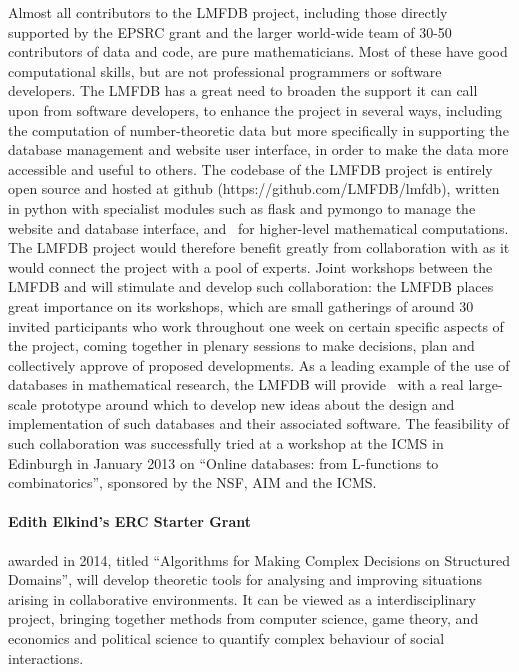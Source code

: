 Almost all contributors to the LMFDB project, including those directly
supported by the EPSRC grant and the larger world-wide team of 30-50
contributors of data and code, are pure mathematicians.  Most of these
have good computational skills, but are not professional programmers
or software developers.  The LMFDB has a great need to broaden the
support it can call upon from software developers, to enhance the
project in several ways, including the computation of number-theoretic
data but more specifically in supporting the database management and
website user interface, in order to make the data more accessible and
useful to others.  The codebase of the LMFDB project is entirely open
source and hosted at github (https://github.com/LMFDB/lmfdb), written
in python with specialist modules such as flask and pymongo to manage
the website and database interface, and \Sage\ for higher-level
mathematical computations.  The LMFDB project would therefore benefit
greatly from collaboration with \TheProject as it would connect the
project with a pool of experts.  Joint workshops between the LMFDB and
\TheProject will stimulate and develop such collaboration: the LMFDB
places great importance on its workshops, which are small gatherings
of around 30 invited participants who work throughout one week on
certain specific aspects of the project, coming together in plenary
sessions to make decisions, plan and collectively approve of proposed
developments.  As a leading example of the use of databases in
mathematical research, the LMFDB will provide \TheProject\ with a real
large-scale prototype around which to develop new ideas about the
design and implementation of such databases and their associated
software.  The feasibility of such collaboration was successfully
tried at a workshop at the ICMS in Edinburgh in January 2013 on
``Online databases: from L-functions to combinatorics'', sponsored by
the NSF, AIM and the ICMS.

\paragraph{Edith Elkind's ERC Starter Grant} awarded in 2014, titled
``Algorithms for Making Complex Decisions on Structured Domains'', 
will develop theoretic tools for analysing and improving situations
arising in collaborative environments. 
It can be viewed as a interdisciplinary project, bringing together methods from
computer science, game theory, and economics and political science
to quantify complex behaviour of social interactions.

